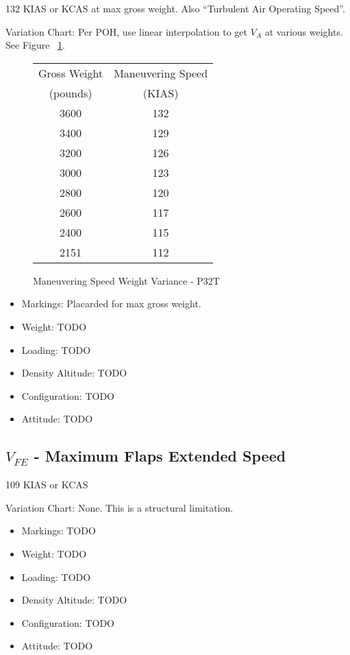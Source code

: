 132 KIAS or KCAS at max gross weight. Also ``Turbulent Air Operating Speed''.

Variation Chart: Per POH, use linear interpolation to get $V_A$ at various weights. See Figure ~\ref{fig:ManeuveringSpeedsP32T}.

\begin{figure}
\begin{center}
\begin{tabular}{ |c|c| }
    \hline
    Gross Weight & Maneuvering Speed \\
    (pounds) & (KIAS) \\
    \hline
     3600 &  132 \\
     3400 &  129 \\
    \hline
     3200 &  126 \\
     3000 &  123 \\
    \hline
     2800 &  120 \\
     2600 &  117 \\
    \hline
     2400 &  115 \\
     2151 &  112 \\
    \hline
\end{tabular}
\end{center}
\caption{Maneuvering Speed Weight Variance - P32T}
\label{fig:ManeuveringSpeedsP32T}
\end{figure}

\begin{itemize}
\item Markings: Placarded for max gross weight.
\item Weight: TODO
\item Loading: TODO
\item Density Altitude: TODO
\item Configuration: TODO
\item Attitude: TODO
\end{itemize}

\subsection{$V_{FE}$ - Maximum Flaps Extended Speed}

109 KIAS or KCAS

Variation Chart: None. This is a structural limitation.

\begin{itemize}
\item Markings: TODO
\item Weight: TODO
\item Loading: TODO
\item Density Altitude: TODO
\item Configuration: TODO
\item Attitude: TODO
\end{itemize}

